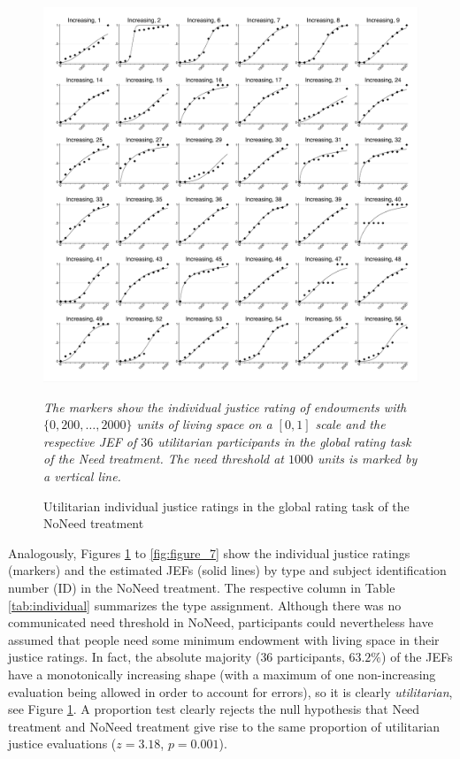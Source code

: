 \documentclass[12pt]{scrartcl}
\begin{document}
\begin{figure}[h!t!]
   \centering
   \includegraphics[width=\linewidth]{figures/figure_5.pdf}
   \begin{minipage}{\linewidth}
      \footnotesize
      \textit{The markers show the individual justice rating of endowments with $\{0,200,\ldots,2000\}$ units of living space on a $[0,1]$ scale and the respective JEF of $36$ utilitarian participants in the global rating task of the Need treatment. The need threshold at $1000$ units is marked by a vertical line.}
   \end{minipage}
   \caption{Utilitarian individual justice ratings in the global rating task of the NoNeed treatment}\label{fig:figure_5}
\end{figure}

Analogously, Figures \ref{fig:figure_5} to \ref{fig:figure_7} show the individual justice ratings (markers) and the estimated JEFs (solid lines) by type and subject identification number (ID) in the NoNeed treatment.
The respective column in Table \ref{tab:individual} summarizes the type assignment.
Although there was no communicated need threshold in NoNeed, participants could nevertheless have assumed that people need some minimum endowment with living space in their justice ratings.
In fact, the absolute majority ($36$ participants, $63.2\%$) of the JEFs have a monotonically increasing shape (with a maximum of one non-increasing evaluation being allowed in order to account for errors), so it is clearly \textit{utilitarian}, see Figure \ref{fig:figure_5}.
A proportion test clearly rejects the null hypothesis that Need treatment and NoNeed treatment give rise to the same proportion of utilitarian justice evaluations ($z=3.18$, $p=0.001$).
\end{document}
